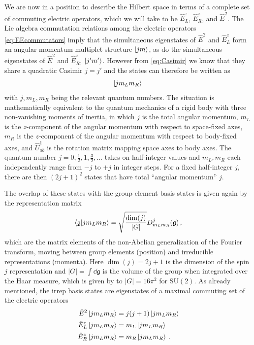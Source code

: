 \documentclass[reprint,superscriptaddress,pra,nofootinbib,preprintnumbers,floatfix]{revtex4-1}
\providecommand{\sutwo}{$\mathrm{SU}(2)$\xspace}
\providecommand{\g}{{\mathfrak{g}}}
\begin{document}
We are now in a position to describe the Hilbert space in terms of a complete set of commuting electric operators, which we will take to be $\hat{E}^z_L$, $\hat{E}^z_R$, and $\hat{E}^2$. 
%
The Lie algebra commutation relations among the electric operators \cref{eq:EEcommutators} imply that the simultaneous eigenstates of $\hat{E}^2$ and $\hat{E}_L^z$ form an angular momentum multiplet structure $\ket{jm}$, as do the simultaneous eigenstates of $\hat{E}^2$ and $\hat{E}_R^z$, $\ket{j'm'}$. 
%
However from \cref{eq:Casimir} we know that they share a quadratic Casimir $j=j'$ and the states can therefore be written as
%
\begin{equation}
    \ket{j{m_L}{m_R}}\, 
\end{equation}
%
with $j, m_L, m_R$ being the relevant quantum numbers. 
%
The situation is mathematically equivalent to the quantum mechanics of a rigid body with three non-vanishing moments of inertia, in which $j$ is the total angular momentum, $m_L$ is the $z$-component of the angular momentum with respect to space-fixed axes, $m_R$ is the $z$-component of the angular momentum with respect to body-fixed axes, and $\hat{U}^1_{ab}$ is the rotation matrix mapping space axes to body axes.
%
The quantum number $j=0,\frac{1}{2},1,\frac{3}{2},\dotsc$ takes on half-integer values and $m_L,m_R$ each independently range from $-j$ to $+j$ in integer steps. For a fixed half-integer $j$, there are then $(2j+1)^2$ states that have total ``angular momentum'' $j$. 



The overlap of these states with the group element basis states is given again by the representation matrix
%
\begin{equation}\label{eq:FT_SU2}
    \braket{\g}{j m_L m_R} = \sqrt{\frac{\dim(j)}{|G|}} D^j_{{m_L}{m_R}}(\g) \,,
\end{equation}
%
which are the matrix elements of the non-Abelian generalization of the Fourier transform, moving between group elements (position) and irreducible representations (momenta). 
%
Here $\dim(j) = 2j+1$ is the dimension of the spin $j$ representation and $|G| = \int\dd{\g}$ is the volume of the group when integrated over the Haar measure, which is given by to $|G| = 16\pi^2$ for \sutwo.
%
As already mentioned, the irrep basis states are eigenstates of a maximal commuting set of the electric operators
%
\begin{equation}\label{eq:Eop_electric_basis}
  \begin{split}
    \hat{E}^2 \ket{j m_L m_R} &= j(j+1) \ket{j m_L m_R} \\
    \hat{E}^z_L \ket{j m_L m_R} &= m_L \ket{j m_L m_R} \\
    \hat{E}^z_R \ket{j m_L m_R} &= m_R \ket{j m_L m_R} \,.
  \end{split}
\end{equation}
\end{document}
